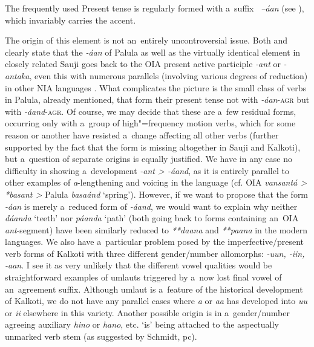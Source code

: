  The frequently used Present tense is regularly formed with a~suffix
\textit{~--áan} (see ), which invariably carries the accent.


The origin of this element is not an~entirely uncontroversial issue. Both \citet[22]{morgenstierne1941} and \citet[48]{buddruss1967} clearly state that the \textit{-áan} of Palula as well as the virtually identical element in closely related Sauji goes back to the OIA present active participle \textit{-ant} or \textit{-antaka}, even this with numerous parallels (involving various degrees of reduction) in other NIA languages \citep[270--271]{masica1991}. What complicates the picture is the small class of verbs in Palula, already mentioned, that form their present tense not with \textit{-áan}-\textsc{agr} but with \textit{-áand}-\textsc{agr}. Of course, we may decide that these are a~few residual forms, occurring only with a~group of high"=frequency motion verbs, which for some reason or another have resisted a~change affecting all other verbs (further supported by the fact that the form is missing altogether in Sauji and Kalkoti), but a~question of separate origins is equally justified. We have in any case no difficulty in showing a~development \textit{-ant {\textgreater} -áand}, as it is entirely parallel to other examples of \textit{a}-lengthening and voicing in the language (cf. OIA \textit{vansantá {\textgreater} *basant {\textgreater}} Palula \textit{basaánd} `spring'). However, if we want to propose that the form \textit{-áan} is merely a~reduced form of \textit{-áand}, we would want to explain why neither \textit{dáanda} `teeth' nor \textit{páanda} `path' (both going back to forms containing an~OIA \textit{ant}-segment) have been similarly reduced to \textit{**daana} and \textit{**paana} in the modern languages. We also have a~particular problem posed by the imperfective/present verb forms of Kalkoti with three different gender/number allomorphs: \textit{-uun, -iin, -aan}. I see it as very unlikely that the different vowel qualities would be straightforward examples of umlauts triggered by a~now lost final vowel of an~agreement suffix. Although umlaut is a~feature of the historical development of Kalkoti, we do not have any parallel cases where \textit{‌a‌} or \textit{‌aa‌} has developed into \textit{‌uu‌} or \textit{‌ii‌} elsewhere in this variety. Another possible origin is in a~gender/number agreeing auxiliary \textit{hino} or \textit{hano}, etc. `is' being attached to the aspectually unmarked verb stem (as suggested by Schmidt, pc). 



